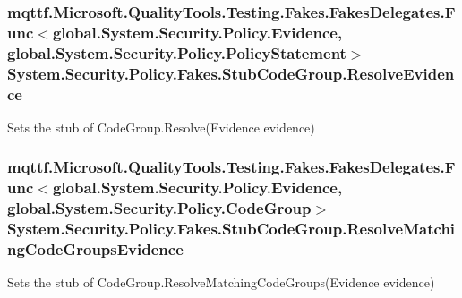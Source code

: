 \hypertarget{class_system_1_1_security_1_1_policy_1_1_fakes_1_1_stub_code_group_a908d054966244c2752028dc1ef2b4c85}{
\subsubsection[{Resolve\-Evidence}]{\setlength{\rightskip}{0pt plus 5cm}mqttf.\-Microsoft.\-Quality\-Tools.\-Testing.\-Fakes.\-Fakes\-Delegates.\-Func$<$global.\-System.\-Security.\-Policy.\-Evidence, global.\-System.\-Security.\-Policy.\-Policy\-Statement$>$ System.\-Security.\-Policy.\-Fakes.\-Stub\-Code\-Group.\-Resolve\-Evidence}}\label{class_system_1_1_security_1_1_policy_1_1_fakes_1_1_stub_code_group_a908d054966244c2752028dc1ef2b4c85}


Sets the stub of Code\-Group.\-Resolve(\-Evidence evidence)

\hypertarget{class_system_1_1_security_1_1_policy_1_1_fakes_1_1_stub_code_group_aeaf23967955397188ae21123fca4062c}{
\subsubsection[{Resolve\-Matching\-Code\-Groups\-Evidence}]{\setlength{\rightskip}{0pt plus 5cm}mqttf.\-Microsoft.\-Quality\-Tools.\-Testing.\-Fakes.\-Fakes\-Delegates.\-Func$<$global.\-System.\-Security.\-Policy.\-Evidence, global.\-System.\-Security.\-Policy.\-Code\-Group$>$ System.\-Security.\-Policy.\-Fakes.\-Stub\-Code\-Group.\-Resolve\-Matching\-Code\-Groups\-Evidence}}\label{class_system_1_1_security_1_1_policy_1_1_fakes_1_1_stub_code_group_aeaf23967955397188ae21123fca4062c}


Sets the stub of Code\-Group.\-Resolve\-Matching\-Code\-Groups(\-Evidence evidence)



